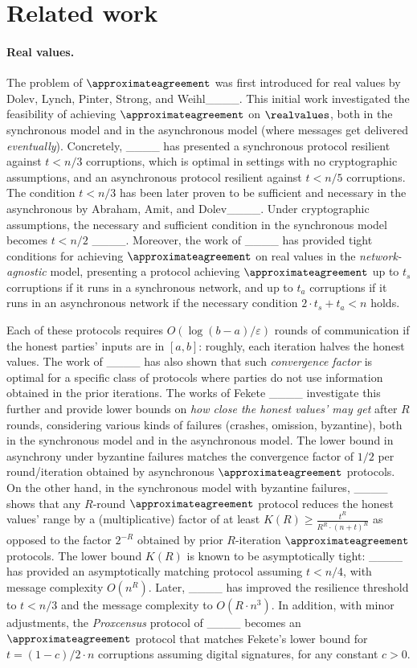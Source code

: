 \section{Related work}
\paragraph{Real values.}
The problem of $\approximateagreement$ was first introduced for real values by Dolev, Lynch, Pinter, Strong, and Weihl____. This initial work investigated the feasibility of achieving $\approximateagreement$ on $\realvalues$, both in the synchronous model and in the asynchronous model (where messages get delivered \emph{eventually}). Concretely, ____ has presented a synchronous protocol resilient against $t < n / 3$ corruptions, which is optimal in settings with no cryptographic assumptions, and an asynchronous protocol resilient against $t < n/5$ corruptions. The condition $t < n / 3$ has been later proven to be sufficient and necessary in the asynchronous by Abraham, Amit, and Dolev____. Under cryptographic assumptions, the necessary and sufficient condition in the synchronous model becomes $t < n / 2$ ____. Moreover, the work of ____ has provided tight conditions for achieving $\approximateagreement$ on real values in the \emph{network-agnostic} model, presenting a protocol achieving $\approximateagreement$ up to $t_s$ corruptions if it runs in a synchronous network, and up to $t_a$ corruptions if it runs in an asynchronous network if the necessary condition $2 \cdot t_s + t_a < n$ holds.

Each of these protocols requires $O(\log(b - a) / \varepsilon)$ rounds of communication if the honest parties' inputs are in $[a, b]$: roughly, each iteration halves the honest values. The work of ____ has also shown that such \emph{convergence factor} is optimal for a specific class of protocols where parties do not use information obtained in the prior iterations. The works of Fekete ____ investigate this further and provide lower bounds on \emph{how close the honest values' may get} after $R$ rounds, considering various kinds of failures (crashes, omission, byzantine), both in the synchronous model and in the asynchronous model. The lower bound in asynchrony under byzantine failures matches the convergence factor of $1/2$ per round/iteration obtained by asynchronous $\approximateagreement$ protocols. On the other hand, in the synchronous model with byzantine failures, ____ shows that any $R$-round $\approximateagreement$ protocol reduces the honest values' range by a (multiplicative) factor of at least $K(R) \geq \frac{t^R}{R^R \cdot (n + t)^R}$ as opposed to the factor $2^{-R}$ obtained by prior $R$-iteration $\approximateagreement$ protocols. The lower bound $K(R)$ is known to be asymptotically tight: ____ has provided an asymptotically matching protocol assuming $t < n / 4$, with message complexity $O(n^R)$. Later, ____ has improved the resilience threshold to $t < n / 3$ and the message complexity to $O(R \cdot n^3)$. In addition, with minor adjustments, the \emph{Proxcensus} protocol of ____ becomes an $\approximateagreement$ protocol that matches Fekete's lower bound for $t = (1 - c)/2 \cdot n$ corruptions assuming digital signatures, for any constant $c > 0$.

